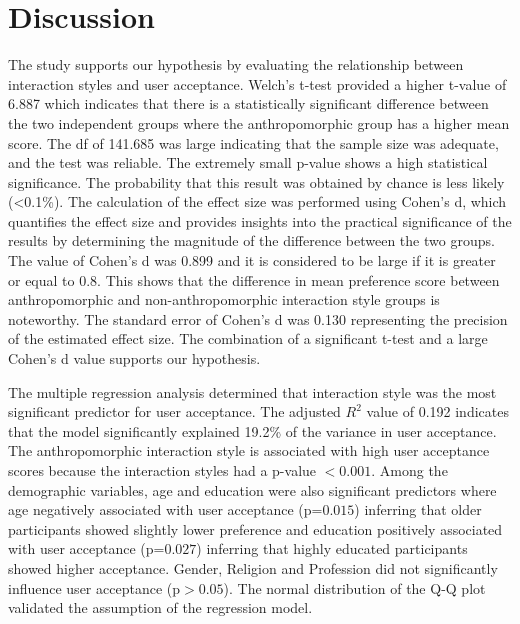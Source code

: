 \documentclass[conference]{IEEEtran}
\begin{document}
  \section{Discussion}
  The study supports our hypothesis by evaluating the relationship between interaction styles and user acceptance. Welch’s t-test provided a higher t-value of 6.887 which indicates that there is a statistically significant difference between the two independent groups where the anthropomorphic group has a higher mean score. The df of 141.685 was large indicating that the sample size was adequate, and the test was reliable. The extremely small p-value shows a high statistical significance. The probability that this result was obtained by chance is less likely (\textless 0.1\%). The calculation of the effect size was performed using Cohen’s d, which quantifies the effect size and provides insights into the practical significance of the results by determining the magnitude of the difference between the two groups. The value of Cohen’s d was 0.899 and it is considered to be large if it is greater or equal to 0.8. This shows that the difference in mean preference score between anthropomorphic and non-anthropomorphic interaction style groups is noteworthy. The standard error of Cohen’s d was 0.130 representing the precision of the estimated effect size. The combination of a significant t-test and a large Cohen’s d value supports our hypothesis. \par
  The multiple regression analysis determined that interaction style was the most significant predictor for user acceptance. The adjusted $R^2$ value of 0.192 indicates that the model significantly explained 19.2\% of the variance in user acceptance. The anthropomorphic interaction style is associated with high user acceptance scores because the interaction styles had a p-value $< 0.001$. Among the demographic variables, age and education were also significant predictors where age negatively associated with user acceptance (p=$0.015$) inferring that older participants showed slightly lower preference and education positively associated with user acceptance (p=$0.027$) inferring that highly educated participants showed higher acceptance. Gender, Religion and Profession did not significantly influence user acceptance (p$>0.05$). The normal distribution of the Q-Q plot validated the assumption of the regression model.      
  
\end{document}

